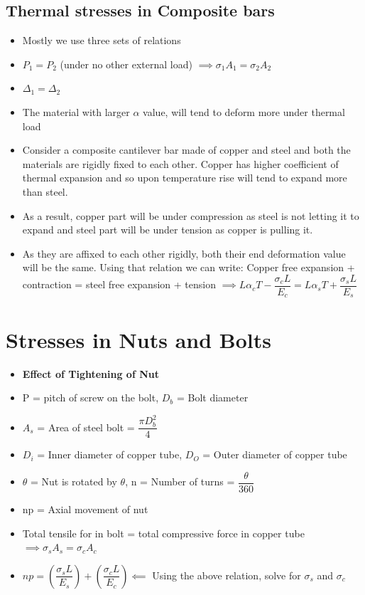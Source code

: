 \documentclass[8pt]{report}
\begin{document}
		\subsection{Thermal stresses in Composite bars}
			\begin{itemize}
				\item Mostly we use three sets of relations 
				\item $P_1 = P_2$ (under no other external load) $\implies \sigma_1A_1 = \sigma_2A_2$
				\item $\Delta_1 = \Delta_2$
				\item The material with larger $\alpha$ value, will tend to deform more under thermal load
				\item Consider a composite cantilever bar made of copper and steel and both the materials are rigidly fixed to each other. Copper has higher coefficient of thermal expansion and so upon temperature rise will tend to expand more than steel. 
				\item As a result, copper part will be under compression as steel is not letting it to expand and steel part will be under tension as copper is pulling it.
				\item As they are affixed to each other rigidly, both their end deformation value will be the same. Using that relation we can write: Copper free expansion + contraction = steel free expansion + tension  $\implies \boxed{L\alpha_cT-\dfrac{\sigma_cL}{E_c}=L\alpha_sT+\dfrac{\sigma_sL}{E_s}}$
			\end{itemize}\hrulefill
	\section{Stresses in Nuts and Bolts}
		\begin{itemize}
			\item \textbf{Effect of Tightening of Nut}
			\item P = pitch of screw on the bolt, $D_b$ = Bolt diameter
			\item $A_s$ = Area of steel bolt = $\dfrac{\pi D_b^2}{4}$
			\item $D_i$ = Inner diameter of copper tube, $D_O$ = Outer diameter of copper tube
			\item $\theta$ = Nut is rotated by $\theta$\textdegree, n = Number of turns = $\dfrac{\theta}{360}$
			\item np = Axial movement of nut
			\item Total tensile for in bolt = total compressive force in copper tube $\implies \sigma_sA_s = \sigma_cA_c$
			\item $\boxed{np = \left(\dfrac{\sigma_sL}{E_s}\right)+\left(\dfrac{\sigma_cL}{E_c}\right)}\impliedby$ Using the above relation, solve for $\sigma_s$ and $\sigma_c$
		\end{itemize}\hrulefill
\end{document}
